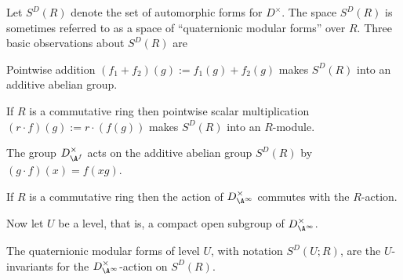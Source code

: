 Let $S^D(R)$ denote the set of automorphic forms for $D^\times$. The space $S^D(R)$ is sometimes referred to as a space of
``quaternionic modular forms'' over $R$.
Three basic observations about $S^D(R)$ are

\begin{definition}
  \label{TotallyDefiniteQuaternionAlgebra.WeightTwoAutomorphicForm.addCommGroup}
  \leanok
  Pointwise addition $(f_1+f_2)(g):=f_1(g)+f_2(g)$ makes $S^D(R)$ into an
  additive abelian group.
\end{definition}

\begin{definition}
  \label{TotallyDefiniteQuaternionAlgebra.WeightTwoAutomorphicForm.module}
  \leanok
  If $R$ is a commutative ring then pointwise scalar multiplication $(r\cdot f)(g):= r\cdot(f(g))$ makes
  $S^D(R)$ into an $R$-module.
\end{definition}

\begin{definition}
  \label{TotallyDefiniteQuaternionAlgebra.WeightTwoAutomorphicForm.distribMulAction}
  \leanok
  The group $D_{\A^f}^\times$ acts on the additive abelian group $S^D(R)$ by $(g\cdot f)(x)=f(xg)$.
\end{definition}

If $R$ is a commutative ring then the action of $D_{\A^\infty}^\times$ commutes with the $R$-action.

Now let $U$ be a level, that is, a compact open subgroup of $D_{\A^\infty}^\times$.

\begin{definition}
  \label{TotallyDefiniteQuaternionAlgebra.WeightTwoAutomorphicFormOfLevel}
  \leanok
  The quaternionic modular forms of level $U$, with notation $S^D(U;R)$, are the $U$-invariants for the $D_{\A^\infty}^\times$-action on $S^D(R)$.
\end{definition}

